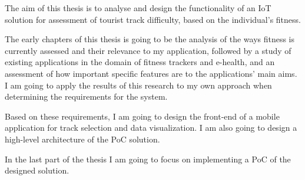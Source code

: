 The aim of this thesis is to analyse and design the functionality of an IoT solution for assessment of tourist track difficulty, based on the individual's fitness.

The early chapters of this thesis is going to be the analysis of the ways fitness is currently assessed and their relevance to my application,
followed by a study of existing applications in the domain of fitness trackers and e-health, and an assessment of how important specific features are to the applications' main aims.
I am going to apply the results of this research to my own approach when determining the requirements for the system.

Based on these requirements, I am going to design the front-end of a mobile application for track selection and data visualization.
I am also going to design a high-level architecture of the PoC solution.

In the last part of the thesis I am going to focus on implementing a PoC of the designed solution.